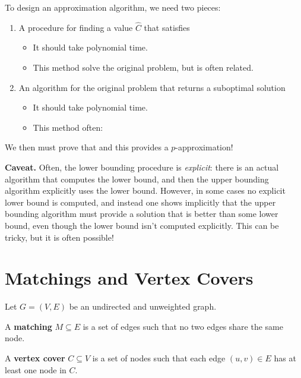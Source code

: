 \documentclass[11  pt]{article}
\begin{document}
\vs{1cm}
To design an approximation algorithm, we need two pieces:

\begin{enumerate}
    \item {} A procedure for finding a value $\hat{C}$ that satisfies 
    \begin{itemize}
        \item It should take polynomial time.
				
				\vs{0.5cm}
        \item This method  solve the original problem, but is often related.
    \end{itemize}
    \item {} An algorithm for the original problem that returns a suboptimal solution 
    \begin{itemize}
        \item It should take polynomial time.
				
				\vs{0.5cm}
        \item This method often: %
    \end{itemize}
\end{enumerate}

We then must prove that  and this provides a $p$-approximation!

\vs{4cm}
\textbf{Caveat.} Often, the lower bounding procedure is \emph{explicit}: there is an actual algorithm that computes the lower bound, and then the upper bounding algorithm explicitly uses the lower bound. However, in some cases no explicit lower bound is computed, and instead one shows implicitly that the upper bounding algorithm must provide a solution that is better than some lower bound, even though the lower bound isn't computed explicitly. This can be tricky, but it is often possible!


\section{Matchings and Vertex Covers}
Let $G = (V, E)$ be an undirected and unweighted graph.


\vs{1cm}
A \textbf{matching} $M \subseteq E$ is a set of edges such that no two edges share the same node.


\vs{1cm}
A \textbf{vertex cover} $C \subseteq V$ is a set of nodes such that each edge $(u, v) \in E$ has at least one node in $C$.
\end{document}
